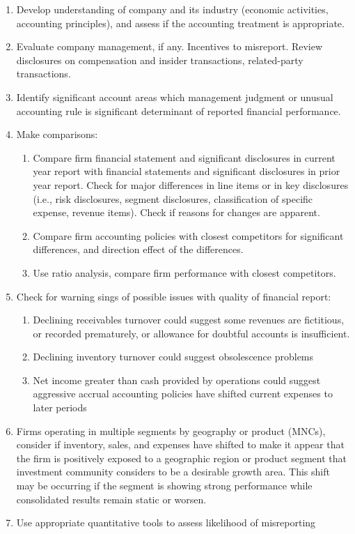 \begin{method} 
\begin{enumerate}[label=\arabic*.]
\setlength{\itemsep}{0pt}
\item Develop understanding of company and its industry (economic activities, accounting principles), and assess if the accounting treatment is appropriate.
\item Evaluate company management, if any. Incentives to misreport. Review disclosures on compensation and insider transactions, related-party transactions.
\item Identify significant account areas which management judgment or unusual accounting rule is significant determinant of reported financial performance.
\item Make comparisons:
\begin{enumerate}[label=\roman*.]
\setlength{\itemsep}{0pt}
\item Compare firm financial statement and significant disclosures in current year report with financial statements and significant disclosures in prior year report. Check for major differences in line items or in key disclosures (i.e., risk disclosures, segment disclosures, classification of specific expense, revenue items). Check if reasons for changes are apparent.
\item Compare firm accounting policies with closest competitors for significant differences, and direction effect of the differences.
\item Use ratio analysis, compare firm performance with closest competitors.
\end{enumerate}
\item Check for warning sings of possible issues with quality of financial report:
\begin{enumerate}[label=\roman*.]
\setlength{\itemsep}{0pt}
\item Declining receivables turnover could suggest some revenues are fictitious, or recorded prematurely, or allowance for doubtful accounts is insufficient.
\item Declining inventory turnover could suggest obsolescence problems
\item Net income greater than cash provided by operations could suggest aggressive accrual accounting policies have shifted current expenses to later periods
\end{enumerate}
\item Firms operating in multiple segments by geography or product (MNCs), consider if inventory, sales, and expenses have shifted to make it appear that the firm is positively exposed to a geographic region or product segment that investment community considers to be a desirable growth area. This shift may be occurring if the segment is showing strong performance while consolidated results remain static or worsen.
\item Use appropriate quantitative tools to assess likelihood of misreporting
\end{enumerate}
\end{method}

